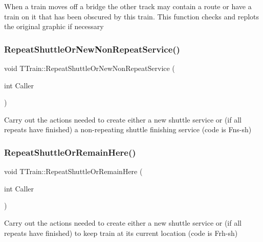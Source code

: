 When a train moves off a bridge the other track may contain a route or have a train on it that has been obscured by this train. This function checks and replots the original graphic if necessary \mbox{\label{class_t_train_a8262f447ec811db7e524c7bb885226c5}} 
\subsubsection{\texorpdfstring{Repeat\+Shuttle\+Or\+New\+Non\+Repeat\+Service()}{RepeatShuttleOrNewNonRepeatService()}}
{\footnotesize\ttfamily void T\+Train\+::\+Repeat\+Shuttle\+Or\+New\+Non\+Repeat\+Service (\begin{DoxyParamCaption}\item[{int}]{Caller }\end{DoxyParamCaption})\hspace{0.3cm}{\ttfamily [private]}}

Carry out the actions needed to create either a new shuttle service or (if all repeats have finished) a non-\/repeating shuttle finishing service (code is Fns-\/sh) \mbox{\label{class_t_train_ac6f5cda912103fda4da31bdca611e4b5}} 
\subsubsection{\texorpdfstring{Repeat\+Shuttle\+Or\+Remain\+Here()}{RepeatShuttleOrRemainHere()}}
{\footnotesize\ttfamily void T\+Train\+::\+Repeat\+Shuttle\+Or\+Remain\+Here (\begin{DoxyParamCaption}\item[{int}]{Caller }\end{DoxyParamCaption})\hspace{0.3cm}{\ttfamily [private]}}

Carry out the actions needed to create either a new shuttle service or (if all repeats have finished) to keep train at its current location (code is Frh-\/sh) \mbox{\label{class_t_train_ace302d98b5685104d294869b161e20a0}} 
